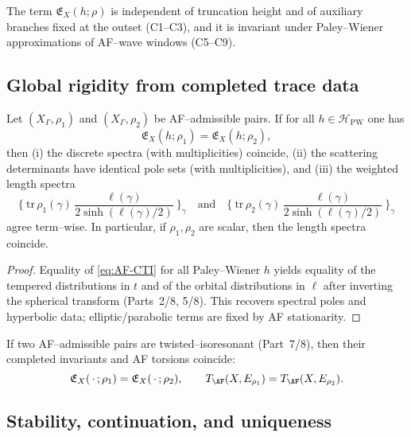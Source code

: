 \begin{remark}
\label{rem:completedness}
The term $\mathfrak{E}_X(h;\rho)$ is independent of truncation height and of auxiliary branches fixed at the outset (C1–C3), and it is invariant under Paley–Wiener approximations of AF–wave windows (C5–C9). %
\end{remark}

\subsection{Global rigidity from completed trace data}
\label{subsec:af-rigidity}
\relax\hspace{0pt}

\begin{theorem}
\label{thm:af-rigidity}
Let $(X_\Gamma,\rho_1)$ and $(X_\Gamma,\rho_2)$ be AF–admissible pairs. If for all $h\in\mathcal{H}_{\mathrm{PW}}$ one has
\[
\mathfrak{E}_X(h;\rho_1)=\mathfrak{E}_X(h;\rho_2),
\]
then (i) the discrete spectra (with multiplicities) coincide, (ii) the scattering determinants have identical pole sets (with multiplicities), and (iii) the weighted length spectra
\[
\Big\{\ \mathrm{tr}\,\rho_1(\gamma)\, \frac{\ell(\gamma)}{2\sinh(\ell(\gamma)/2)}\ \Big\}_\gamma
\quad\text{and}\quad
\Big\{\ \mathrm{tr}\,\rho_2(\gamma)\, \frac{\ell(\gamma)}{2\sinh(\ell(\gamma)/2)}\ \Big\}_\gamma
\]
agree term–wise. In particular, if $\rho_1,\rho_2$ are scalar, then the length spectra coincide.
\end{theorem}

\begin{proof}
Equality of \eqref{eq:AF-CTI} for all Paley–Wiener $h$ yields equality of the tempered distributions in $t$ and of the orbital distributions in $\ell$ after inverting the spherical transform (Parts~2/8, 5/8). This recovers spectral poles and hyperbolic data; elliptic/parabolic terms are fixed by AF stationarity. %
\end{proof}

\begin{corollary}
\label{cor:iso}
If two AF–admissible pairs are twisted–isoresonant (Part~7/8), then their completed invariants and AF torsions coincide:
\[
\mathfrak{E}_X(\,\cdot\,;\rho_1)=\mathfrak{E}_X(\,\cdot\,;\rho_2),\qquad
T_{\AF}(X,E_{\rho_1})=T_{\AF}(X,E_{\rho_2}).
\]
\end{corollary}

\subsection{Stability, continuation, and uniqueness}
\label{subsec:af-stability}
\relax\hspace{0pt}

